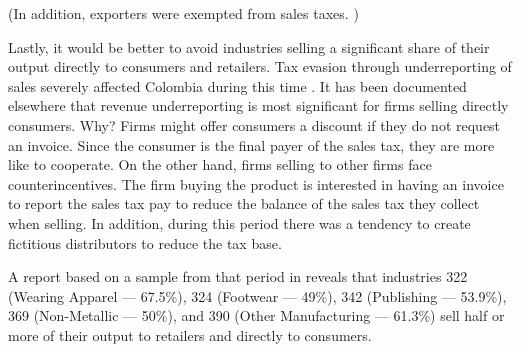 \documentclass[
  12pt]{article}
\theoremstyle{definition}
\theoremstyle{remark}
\begin{document}
(In addition, exporters were exempted from sales taxes. )

Lastly, it would be better to avoid industries selling a significant
share of their output directly to consumers and retailers. Tax evasion
through underreporting of sales severely affected Colombia during this
time \citep{Perry1990}. It has been documented elsewhere that revenue
underreporting is most significant for firms selling directly consumers.
Why? Firms might offer consumers a discount if they do not request an
invoice. Since the consumer is the final payer of the sales tax, they
are more like to cooperate. On the other hand, firms selling to other
firms face counterincentives. The firm buying the product is interested
in having an invoice to report the sales tax pay to reduce the balance
of the sales tax they collect when selling. In addition, during this
period there was a tendency to create fictitious distributors to reduce
the tax base.

A report based on a sample from that period in \citet{Perry1990} reveals
that industries 322 (Wearing Apparel --- 67.5\%), 324 (Footwear ---
49\%), 342 (Publishing --- 53.9\%), 369 (Non-Metallic --- 50\%), and 390
(Other Manufacturing --- 61.3\%) sell half or more of their output to
retailers and directly to consumers.
\end{document}
